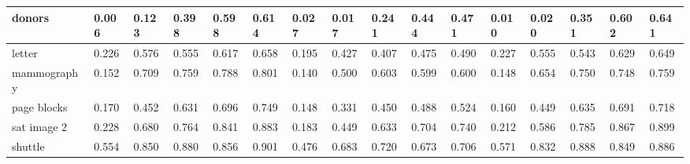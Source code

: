 \begin{table}[]
{\begin{tabular}{|l|lllll|llllllllll|}
donors      & \multicolumn{1}{l|}{0.006} & \multicolumn{1}{l|}{0.123} & \multicolumn{1}{l|}{0.398} & \multicolumn{1}{l|}{0.598} & 0.614          & \multicolumn{1}{l|}{0.027} & \multicolumn{1}{l|}{0.017} & \multicolumn{1}{l|}{0.241} & \multicolumn{1}{l|}{0.444} & \multicolumn{1}{l|}{0.471}          & \multicolumn{1}{l|}{0.010} & \multicolumn{1}{l|}{0.020} & \multicolumn{1}{l|}{0.351} & \multicolumn{1}{l|}{0.602} & 0.641          \\ \hline
letter      & \multicolumn{1}{l|}{0.226} & \multicolumn{1}{l|}{0.576} & \multicolumn{1}{l|}{0.555} & \multicolumn{1}{l|}{0.617} & 0.658          & \multicolumn{1}{l|}{0.195} & \multicolumn{1}{l|}{0.427} & \multicolumn{1}{l|}{0.407} & \multicolumn{1}{l|}{0.475} & \multicolumn{1}{l|}{0.490}          & \multicolumn{1}{l|}{0.227} & \multicolumn{1}{l|}{0.555} & \multicolumn{1}{l|}{0.543} & \multicolumn{1}{l|}{0.629} & 0.649          \\ \hline
mammography & \multicolumn{1}{l|}{0.152} & \multicolumn{1}{l|}{0.709} & \multicolumn{1}{l|}{0.759} & \multicolumn{1}{l|}{0.788} & 0.801          & \multicolumn{1}{l|}{0.140} & \multicolumn{1}{l|}{0.500} & \multicolumn{1}{l|}{0.603} & \multicolumn{1}{l|}{0.599} & \multicolumn{1}{l|}{0.600}          & \multicolumn{1}{l|}{0.148} & \multicolumn{1}{l|}{0.654} & \multicolumn{1}{l|}{0.750} & \multicolumn{1}{l|}{0.748} & 0.759          \\ \hline
page blocks & \multicolumn{1}{l|}{0.170} & \multicolumn{1}{l|}{0.452} & \multicolumn{1}{l|}{0.631} & \multicolumn{1}{l|}{0.696} & 0.749          & \multicolumn{1}{l|}{0.148} & \multicolumn{1}{l|}{0.331} & \multicolumn{1}{l|}{0.450} & \multicolumn{1}{l|}{0.488} & \multicolumn{1}{l|}{0.524}          & \multicolumn{1}{l|}{0.160} & \multicolumn{1}{l|}{0.449} & \multicolumn{1}{l|}{0.635} & \multicolumn{1}{l|}{0.691} & 0.718          \\ \hline
sat image 2 & \multicolumn{1}{l|}{0.228} & \multicolumn{1}{l|}{0.680} & \multicolumn{1}{l|}{0.764} & \multicolumn{1}{l|}{0.841} & 0.883          & \multicolumn{1}{l|}{0.183} & \multicolumn{1}{l|}{0.449} & \multicolumn{1}{l|}{0.633} & \multicolumn{1}{l|}{0.704} & \multicolumn{1}{l|}{0.740}          & \multicolumn{1}{l|}{0.212} & \multicolumn{1}{l|}{0.586} & \multicolumn{1}{l|}{0.785} & \multicolumn{1}{l|}{0.867} & 0.899          \\ \hline
shuttle     & \multicolumn{1}{l|}{0.554} & \multicolumn{1}{l|}{0.850} & \multicolumn{1}{l|}{0.880} & \multicolumn{1}{l|}{0.856} & 0.901          & \multicolumn{1}{l|}{0.476} & \multicolumn{1}{l|}{0.683} & \multicolumn{1}{l|}{0.720} & \multicolumn{1}{l|}{0.673} & \multicolumn{1}{l|}{0.706}          & \multicolumn{1}{l|}{0.571} & \multicolumn{1}{l|}{0.832} & \multicolumn{1}{l|}{0.888} & \multicolumn{1}{l|}{0.849} & 0.886          \\ \hline

\end{tabular}}
\end{table}

